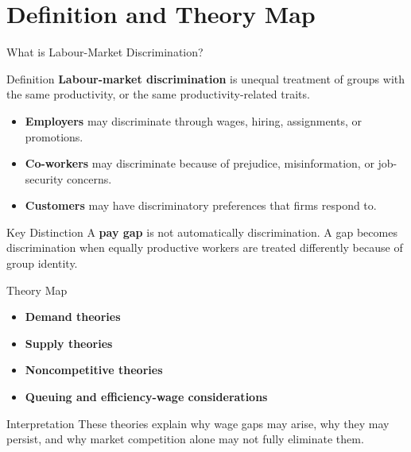 \documentclass[aspectratio=169]{beamer}
\begin{document}
\section{Definition and Theory Map}

\begin{frame}{What is Labour-Market Discrimination?}
\transfade
\begin{block}{Definition}
\textbf{Labour-market discrimination} is unequal treatment of groups with the same productivity, or the same productivity-related traits.
\end{block}

\begin{itemize}[<+->]
  \item \textbf{Employers} may discriminate through wages, hiring, assignments, or promotions.
  \item \textbf{Co-workers} may discriminate because of prejudice, misinformation, or job-security concerns.
  \item \textbf{Customers} may have discriminatory preferences that firms respond to.
\end{itemize}

\begin{block}{Key Distinction}
A \textbf{pay gap} is not automatically discrimination. A gap becomes discrimination when equally productive workers are treated differently because of group identity.
\end{block}
\end{frame}

\begin{frame}{Theory Map}
\transfade
\begin{itemize}[<+->]
  \item \textbf{Demand theories}
  \item \textbf{Supply theories}
  \item \textbf{Noncompetitive theories}
  \item \textbf{Queuing and efficiency-wage considerations}
\end{itemize}

\begin{block}{Interpretation}
These theories explain why wage gaps may arise, why they may persist, and why market competition alone may not fully eliminate them.
\end{block}
\end{frame}
\end{document}
